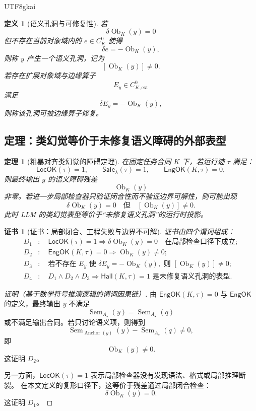 \documentclass[12pt]{article}
\newtheorem{definition}{定义}[section]
\newtheorem{theorem}{定理}[section]
\newtheorem{Certificate}{证书}[section]
\newcommand{\Safe}{\mathsf{Safe}}
\newcommand{\LocOK}{\mathsf{LocOK}}
\newcommand{\EngOK}{\mathsf{EngOK}}
\newcommand{\Hall}{\mathsf{Hall}}
\newcommand{\Sem}{\operatorname{Sem}}
\newcommand{\Anchor}{\operatorname{Anchor}}
\newcommand{\Ob}{\operatorname{Ob}}
\begin{document}
\begin{CJK*}{UTF8}{gkai}
\begin{definition}[语义孔洞与可修复性]
若
\[
  \delta\Ob_K(y)=0
\]
但不存在当前对象域内的 \(e\in C^0_K\) 使得
\[
  \delta e=-\Ob_K(y),
\]
则称 \(y\) 产生一个语义孔洞，记为
\[
  [\Ob_K(y)]\ne 0.
\]
若存在扩展对象域与边缘算子
\[
  E_y\in C^0_{K,\mathrm{ext}}
\]
满足
\[
  \delta E_y=-\Ob_K(y),
\]
则称该孔洞可被边缘算子修复。
\end{definition}

\subsection{定理：类幻觉等价于未修复语义障碍的外部表型}
\label{subsec:tex51-main-theorem}

\begin{theorem}[粗暴对齐类幻觉的障碍定理]
\label{thm:tex51-hallucination-obstruction}
在固定任务合同 \(K\) 下，若运行迹 \(\tau\) 满足：
\[
  \LocOK(\tau)=1,
  \qquad
  \Safe_\lambda(\tau)=1,
  \qquad
  \EngOK(K,\tau)=0,
\]
则最终输出 \(y\) 的语义障碍残差
\[
  \Ob_K(y)
\]
非零。若进一步局部检查器只验证闭合性而不验证边界可解性，则可能出现
\[
  \delta\Ob_K(y)=0
  \quad\text{但}\quad
  [\Ob_K(y)]\ne 0.
\]
此时 LLM 的类幻觉表型等价于“未修复语义孔洞”的运行时投影。
\end{theorem}

\begin{Certificate}[证书：局部闭合、工程失败与边界不可解]
\label{cert:tex51-hallucination-obstruction}
证书由四个谓词组成：
\[
\begin{aligned}
  D_1&:\quad \LocOK(\tau)=1
  \Rightarrow
  \delta\Ob_K(y)=0
  \quad\text{在局部检查口径下成立};\\
  D_2&:\quad \EngOK(K,\tau)=0
  \Rightarrow
  \Ob_K(y)\ne 0;\\
  D_3&:\quad \text{若不存在 }E_y\text{ 使 }\delta E_y=-\Ob_K(y),
  \text{ 则 }[\Ob_K(y)]\ne 0;\\
  D_4&:\quad D_1\wedge D_2\wedge D_3
  \Rightarrow
  \Hall(K,\tau)=1
  \text{ 是未修复语义孔洞的表型}.
\end{aligned}
\]
\end{Certificate}

\begin{proof}[证明（基于数学符号推演逻辑的谓词因果链）]
由 \(\EngOK(K,\tau)=0\) 与 \(\EngOK\) 的定义，最终输出 \(y\) 不满足
\[
  \Sem_{A_\star}(y)=\Sem_{A_\star}(q)
\]
或不满足输出合同。若只讨论语义项，则得到
\[
  \Sem_{\Anchor(y)}(y)-\Sem_{A_\star}(q)\ne 0,
\]
即
\[
  \Ob_K(y)\ne 0.
\]
这证明 \(D_2\)。

另一方面，\(\LocOK(\tau)=1\) 表示局部检查器没有发现语法、格式或局部推理断裂。
在本文定义的复形口径下，这等价于残差通过局部闭合检查：
\[
  \delta\Ob_K(y)=0.
\]
这证明 \(D_1\)。


\end{proof}
\end{CJK*}
\end{document}
